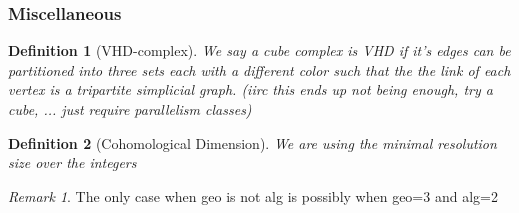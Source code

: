 \documentclass{article}
\theoremstyle{mystyle}
\newtheorem{defn}{Definition}[section]
\theoremstyle{remark}
\newtheorem{rmk}{Remark}[section]
\begin{document}
\subsubsection{Miscellaneous}


\begin{defn}
    [VHD-complex]
    \label{defn:vhd} 
    We say a cube complex is VHD if it's edges can be partitioned into three sets each with a different color such that the the link of each vertex is a tripartite simplicial graph. (iirc this ends up not being enough, try a cube, ... just require parallelism classes)
\end{defn}
\begin{defn}
    [Cohomological Dimension]
    \label{defn:cd} 
    We are using the minimal resolution size over the integers
\end{defn}

\begin{rmk}
    The only case when geo is not alg is possibly when geo=3 and alg=2
\end{rmk}
 
\end{document}
